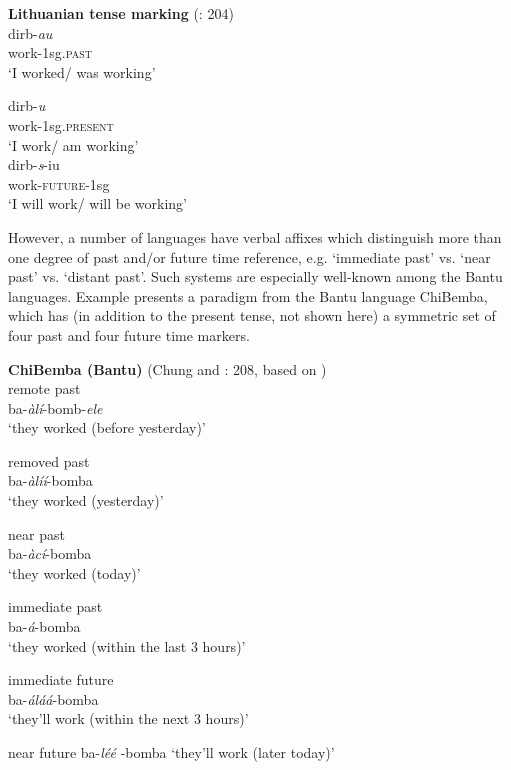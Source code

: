\ea \label{ex:21.36}
\textbf{Lithuanian tense marking} (\citealt{ChungTimberlake1985}: 204)\\
\ea  
\gll dirb-\textit{au}\\
work-1sg\textsc{.past} \\
\glt ‘I worked/ was working’

\ex
\gll dirb-\textit{u}\\
work-1sg\textsc{.present} \\
\glt ‘I work/ am working’\\

\ex
\gll dirb-\textit{s}-iu\\
work-\textsc{future-}1sg \\
\glt ‘I will work/ will be working’
\z
\z

However, a number of languages have verbal affixes which distinguish more than one degree of past and/or future time reference, e.g. ‘immediate past’ vs. ‘near past’ vs. ‘distant past’. Such systems are especially well-known among the Bantu languages. Example  presents a paradigm from the Bantu language ChiBemba, which has (in addition to the present tense, not shown here) a symmetric set of four past and four future time markers.

\ea \label{ex:21.37}
\textbf{ChiBemba (Bantu)} (Chung and \citealt{Timberlake1985}: 208, based on \citealt{Givón1972})\\
\ea  remote past\\
    ba-\textit{àlí}-bomb-\textit{ele}   \\
\glt‘they worked (before yesterday)’

\ex removed past\\
     ba-\textit{àlíí}-bomba   \\
\glt‘they worked (yesterday)’

\ex near past \\
    ba-\textit{àcí}-bomba   \\
\glt‘they worked (today)’

\ex immediate past \\
   ba-\textit{á}-bomba   \\
\glt‘they worked (within the last 3 hours)’

\ex immediate future   \\
 ba-\textit{áláá}-bomba \\  
\glt‘they’ll work (within the next 3 hours)’

\ex near future  
  ba-\textit{léé} -bomba   
\glt‘they’ll work (later today)’

